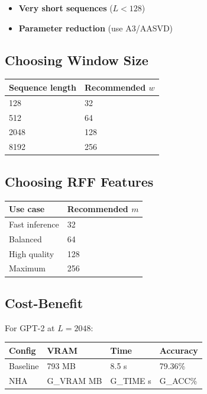 \begin{itemize}
\item \textbf{Very short sequences} ($L < 128$)
\item \textbf{Parameter reduction} (use A3/AASVD)

\end{itemize}
\subsection{Choosing Window Size}

\begin{table}[H]
\centering
\small
\begin{tabular}{ll}
\toprule
\textbf{Sequence length} & \textbf{Recommended $w$} \\
\midrule
128 & 32 \\
512 & 64 \\
2048 & 128 \\
8192 & 256 \\
\bottomrule
\end{tabular}
\end{table}

\subsection{Choosing RFF Features}

\begin{table}[H]
\centering
\small
\begin{tabular}{ll}
\toprule
\textbf{Use case} & \textbf{Recommended $m$} \\
\midrule
Fast inference & 32 \\
Balanced & 64 \\
High quality & 128 \\
Maximum & 256 \\
\bottomrule
\end{tabular}
\end{table}

\subsection{Cost-Benefit}

For GPT-2 at $L = 2048$:

\begin{table}[H]
\centering
\small
\begin{tabular}{llll}
\toprule
\textbf{Config} & \textbf{VRAM} & \textbf{Time} & \textbf{Accuracy} \\
\midrule
Baseline & 793 MB & 8.5 s & 79.36\% \\
NHA & {{G\_VRAM}} MB & {{G\_TIME}} s & {{G\_ACC}}\% \\
\bottomrule
\end{tabular}
\end{table}

